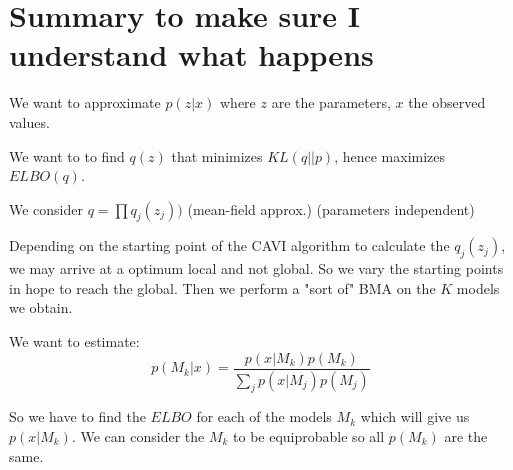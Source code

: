 \section{Summary to make sure I understand what happens}
We want to approximate $p(z|x)$ where $z$ are the parameters, $x$ the observed values.

We want to to find $q(z)$ that minimizes $KL(q||p)$, hence maximizes $ELBO(q)$.

We consider $q = \prod q_j (z_j))$ (mean-field approx.) (parameters independent)

Depending on the starting point of the CAVI algorithm to calculate the $q_j(z_j)$, we may arrive at a optimum local and not global. So we vary the starting points in hope to reach the global. Then we perform a "sort of" BMA on the $K$ models we obtain.

We want to estimate:
$$
p(M_k|x) = \frac{p(x|M_k)p(M_k)}{\sum_j p(x|M_j)p(M_j)}
$$

So we have to find the $ELBO$ for each of the models $M_k$ which will give us $p(x|M_k)$. We can consider the $M_k$ to be equiprobable so all $p(M_k)$ are the same.